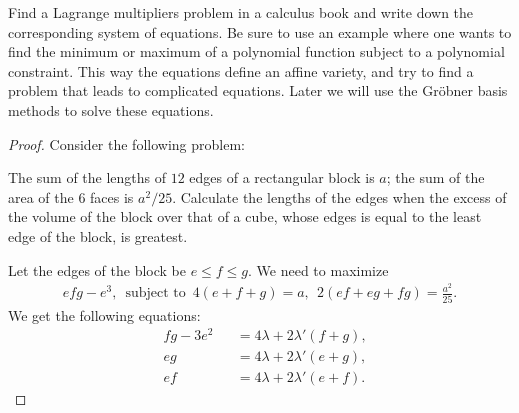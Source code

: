 \begin{exercise}{12}
    Find a Lagrange multipliers problem in a calculus book and write down the corresponding system of equations. 
    Be sure to use an example where one wants to find the minimum or maximum of a polynomial function subject to a polynomial constraint. 
    This way the equations define an affine variety, and try to find a problem that leads to complicated equations. 
    Later we will use the Gr\"obner basis methods to solve these equations.
\end{exercise}
\begin{proof}
    Consider the following problem:

    The sum of the lengths of $12$ edges of a rectangular block is $a$; 
    the sum of the area of the $6$ faces is $a^2/25$. 
    Calculate the lengths of the edges when the excess of the volume of the block over that of a cube, whose edges is equal to the least edge of the block, is greatest.

    Let the edges of the block be $e\leq f\leq g$. 
    We need to maximize
    \begin{align*}
        efg - e^3,\, \text{ subject to }\, 4(e+f+g) = a,~~2(ef + eg + fg) = \frac{a^2}{25}.
    \end{align*}
    We get the following equations:
    \begin{align*}
        &fg - 3e^2 &&= 4\lambda + 2\lambda' (f+g),\\
        &eg &&= 4\lambda + 2\lambda' (e+g),\\
        &ef &&= 4\lambda + 2\lambda' (e+f).
    \end{align*}
    
\end{proof}

